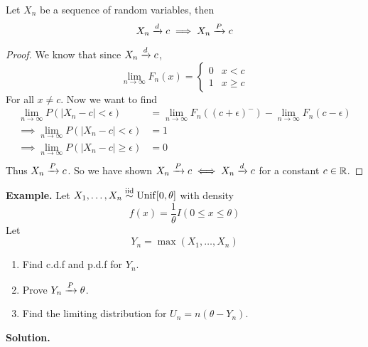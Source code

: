 \documentclass[openany]{report}
\begin{document}
    \begin{theorem}
        Let $X_n$ be a sequence of random variables, then 
        \[X_n \xrightarrow{d} c \implies X_n \xrightarrow{P} c\]
    \end{theorem}
    \begin{proof}
        We know that since $X_n \xrightarrow{d} c$, 
        \[\lim_{n\rightarrow \infty}F_n(x) = \begin{cases}
            0 & x  < c\\
            1 & x \geq c
        \end{cases}\]
        For all $x \neq c$. Now we want to find 
        \begin{align*}
            \lim_{n\rightarrow\infty}P(|X_n-c| < \epsilon) &= \lim_{n\rightarrow\infty}F_n((c+\epsilon)^-) - \lim_{n\rightarrow \infty}F_n(c-\epsilon)\\
            \implies \lim_{n\rightarrow \infty}P(|X_n-c| < \epsilon) &= 1\\
            \implies \lim_{n\rightarrow \infty}P(|X_n-c| \geq \epsilon) &= 0\\
        \end{align*}
        Thus $X_n \xrightarrow{P} c$. So we have shown $X_n \xrightarrow{P} c \iff X_n \xrightarrow{d} c$ for a constant $c \in \mathbb{R}$.
    \end{proof}
    \textbf{Example.} Let $X_1, \ldots, X_n \overset{\mathrm{iid}}{\sim} \operatorname{Unif}[0, \theta]$ with density 
    \[f(x) = \frac{1}{\theta}I(0 \leq x \leq \theta)\]
    Let 
    \[Y_n = \max(X_1, \ldots, X_n)\]
    \begin{enumerate}[label=(\roman*)]
        \item Find c.d.f and p.d.f for $Y_n$.
        \item Prove $Y_n \xrightarrow{P} \theta$.
        \item Find the limiting distribution for $U_n = n(\theta - Y_n)$.
    \end{enumerate}
    \textbf{Solution.}
\end{document}
